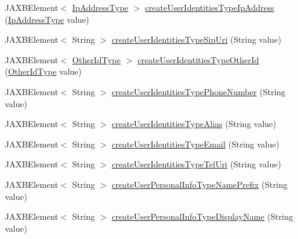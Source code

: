 \begin{DoxyCompactItemize}
\item 
JAXBElement$<$ \hyperlink{classcom_1_1telefonica_1_1schemas_1_1unica_1_1rest_1_1common_1_1v1_1_1IpAddressType}{IpAddressType} $>$ \hyperlink{classcom_1_1telefonica_1_1schemas_1_1unica_1_1rest_1_1directory_1_1v1_1_1ObjectFactory_a6ff5bb7ae2916d173c29495b7ba407d6}{createUserIdentitiesTypeIpAddress} (\hyperlink{classcom_1_1telefonica_1_1schemas_1_1unica_1_1rest_1_1common_1_1v1_1_1IpAddressType}{IpAddressType} value)
\item 
JAXBElement$<$ String $>$ \hyperlink{classcom_1_1telefonica_1_1schemas_1_1unica_1_1rest_1_1directory_1_1v1_1_1ObjectFactory_afe6c44534e6d68148a54eb559af3f811}{createUserIdentitiesTypeSipUri} (String value)
\item 
JAXBElement$<$ \hyperlink{classcom_1_1telefonica_1_1schemas_1_1unica_1_1rest_1_1common_1_1v1_1_1OtherIdType}{OtherIdType} $>$ \hyperlink{classcom_1_1telefonica_1_1schemas_1_1unica_1_1rest_1_1directory_1_1v1_1_1ObjectFactory_acf0c1e6df1be093e5df8227476a0619c}{createUserIdentitiesTypeOtherId} (\hyperlink{classcom_1_1telefonica_1_1schemas_1_1unica_1_1rest_1_1common_1_1v1_1_1OtherIdType}{OtherIdType} value)
\item 
JAXBElement$<$ String $>$ \hyperlink{classcom_1_1telefonica_1_1schemas_1_1unica_1_1rest_1_1directory_1_1v1_1_1ObjectFactory_a6ddd0fc74267a60f394355842ad046c7}{createUserIdentitiesTypePhoneNumber} (String value)
\item 
JAXBElement$<$ String $>$ \hyperlink{classcom_1_1telefonica_1_1schemas_1_1unica_1_1rest_1_1directory_1_1v1_1_1ObjectFactory_adf3edb2934ccbfd2a7007f8982c90682}{createUserIdentitiesTypeAlias} (String value)
\item 
JAXBElement$<$ String $>$ \hyperlink{classcom_1_1telefonica_1_1schemas_1_1unica_1_1rest_1_1directory_1_1v1_1_1ObjectFactory_a399f18868c529c8d408937e76864e39b}{createUserIdentitiesTypeEmail} (String value)
\item 
JAXBElement$<$ String $>$ \hyperlink{classcom_1_1telefonica_1_1schemas_1_1unica_1_1rest_1_1directory_1_1v1_1_1ObjectFactory_a9a5a163d5aa758b100f675aadd2fa6fb}{createUserIdentitiesTypeTelUri} (String value)
\item 
JAXBElement$<$ String $>$ \hyperlink{classcom_1_1telefonica_1_1schemas_1_1unica_1_1rest_1_1directory_1_1v1_1_1ObjectFactory_ac9c5f5255cef2ab4a5c8bf0d5661386b}{createUserPersonalInfoTypeNamePrefix} (String value)
\item 
JAXBElement$<$ String $>$ \hyperlink{classcom_1_1telefonica_1_1schemas_1_1unica_1_1rest_1_1directory_1_1v1_1_1ObjectFactory_ad47c430d0bf1f05df17fdb3c6619096e}{createUserPersonalInfoTypeDisplayName} (String value)

\end{DoxyCompactItemize}
